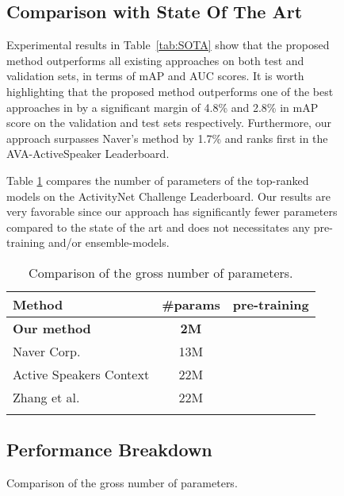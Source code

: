 \documentclass[a4paper]{article}
\newcommand{\xmark}{\ding{55}}\newcommand{\cmark}{\ding{51}}\usepackage{setspace}
\begin{document}
\begin{figure}[t]
\subsection{Comparison with State Of The Art}
\label{evaluation:SOTA}

Experimental results in Table~\ref{tab:SOTA} show that the proposed method outperforms all existing approaches on both test and validation sets, in terms of mAP and AUC scores. It is worth highlighting that the proposed method outperforms one of the best approaches in \cite{Alcazar_2020_CVPR} by a significant margin of 4.8\% and 2.8\% in mAP score on the validation and test sets respectively. Furthermore, our approach surpasses Naver's method \cite{naver} by 1.7\% and ranks first in the AVA-ActiveSpeaker Leaderboard.





Table \ref{tab:numberOfParameters} compares the number of parameters of the top-ranked models on the ActivityNet Challenge Leaderboard.
Our results are very favorable since our approach has significantly fewer parameters compared to the state of the art and does not necessitates any pre-training and/or ensemble-models. 



\begin{table}[h]
\begin{center}
\caption{Comparison of the gross number of parameters.}
\label{tab:numberOfParameters}
\begin{tabular}{lcc}
\Xhline{2\arrayrulewidth}
Method & \#params & pre-training\\
\hline
\bf{Our method} & \bf{2M} & \xmark \\
Naver Corp. \cite{naver} & 13M & \cmark  \\ 
Active Speakers Context \cite{Alcazar_2020_CVPR} & 22M & \cmark  \\ 
Zhang et al. \cite{Zhang2019MultiTask_3Dconv} & 22M & \cmark  \\ 
\Xhline{2\arrayrulewidth}
\end{tabular}
\end{center}
\vspace{-8mm}
\end{table}


\subsection{Performance Breakdown} \label{evaluation:fusion_eval}


\end{figure}
\end{document}
